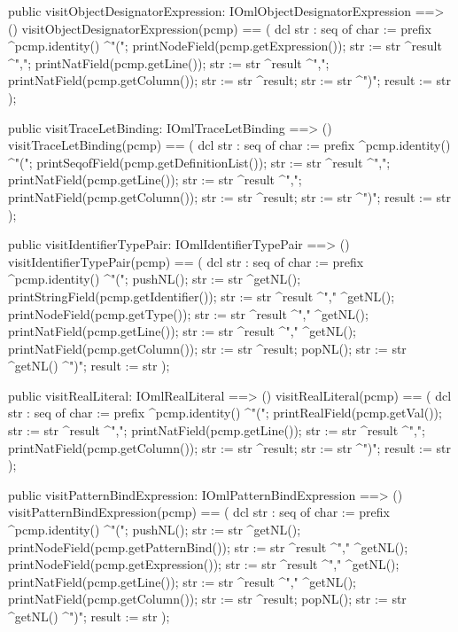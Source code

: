 \begin{vdm_al}
  public visitObjectDesignatorExpression: IOmlObjectDesignatorExpression ==> ()
  visitObjectDesignatorExpression(pcmp) ==
    ( dcl str : seq of char := prefix ^pcmp.identity() ^"(";
      printNodeField(pcmp.getExpression());
      str := str ^result ^",";
      printNatField(pcmp.getLine());
      str := str ^result ^",";
      printNatField(pcmp.getColumn());
      str := str ^result;
      str := str ^")";
      result := str );

  public visitTraceLetBinding: IOmlTraceLetBinding ==> ()
  visitTraceLetBinding(pcmp) ==
    ( dcl str : seq of char := prefix ^pcmp.identity() ^"(";
      printSeqofField(pcmp.getDefinitionList());
      str := str ^result ^",";
      printNatField(pcmp.getLine());
      str := str ^result ^",";
      printNatField(pcmp.getColumn());
      str := str ^result;
      str := str ^")";
      result := str );

  public visitIdentifierTypePair: IOmlIdentifierTypePair ==> ()
  visitIdentifierTypePair(pcmp) ==
    ( dcl str : seq of char := prefix ^pcmp.identity() ^"(";
      pushNL();
      str := str ^getNL();
      printStringField(pcmp.getIdentifier());
      str := str ^result ^"," ^getNL();
      printNodeField(pcmp.getType());
      str := str ^result ^"," ^getNL();
      printNatField(pcmp.getLine());
      str := str ^result ^"," ^getNL();
      printNatField(pcmp.getColumn());
      str := str ^result;
      popNL();
      str := str ^getNL() ^")";
      result := str );

  public visitRealLiteral: IOmlRealLiteral ==> ()
  visitRealLiteral(pcmp) ==
    ( dcl str : seq of char := prefix ^pcmp.identity() ^"(";
      printRealField(pcmp.getVal());
      str := str ^result ^",";
      printNatField(pcmp.getLine());
      str := str ^result ^",";
      printNatField(pcmp.getColumn());
      str := str ^result;
      str := str ^")";
      result := str );

  public visitPatternBindExpression: IOmlPatternBindExpression ==> ()
  visitPatternBindExpression(pcmp) ==
    ( dcl str : seq of char := prefix ^pcmp.identity() ^"(";
      pushNL();
      str := str ^getNL();
      printNodeField(pcmp.getPatternBind());
      str := str ^result ^"," ^getNL();
      printNodeField(pcmp.getExpression());
      str := str ^result ^"," ^getNL();
      printNatField(pcmp.getLine());
      str := str ^result ^"," ^getNL();
      printNatField(pcmp.getColumn());
      str := str ^result;
      popNL();
      str := str ^getNL() ^")";
      result := str );


\end{vdm_al}
